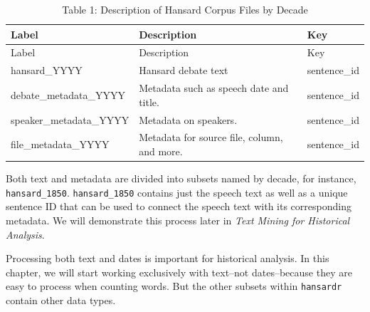 \documentclass[
]{article}
\begin{document}
\begin{longtable}[]{@{}
  >{\raggedright\arraybackslash}p{}
  >{\raggedright\arraybackslash}p{}
  >{\raggedright\arraybackslash}p{}@{}}
\caption{Table 1: Description of Hansard Corpus Files by
Decade}\tabularnewline
\toprule\noalign{}
\begin{minipage}[b]{\linewidth}\raggedright
Label
\end{minipage} & \begin{minipage}[b]{\linewidth}\raggedright
Description
\end{minipage} & \begin{minipage}[b]{\linewidth}\raggedright
Key
\end{minipage} \\
\midrule\noalign{}
\endfirsthead
\toprule\noalign{}
\begin{minipage}[b]{\linewidth}\raggedright
Label
\end{minipage} & \begin{minipage}[b]{\linewidth}\raggedright
Description
\end{minipage} & \begin{minipage}[b]{\linewidth}\raggedright
Key
\end{minipage} \\
\midrule\noalign{}
\endhead
\bottomrule\noalign{}
\endlastfoot
hansard\_YYYY & Hansard debate text & sentence\_id \\
debate\_metadata\_YYYY & Metadata such as speech date and title. &
sentence\_id \\
speaker\_metadata\_YYYY & Metadata on speakers. & sentence\_id \\
file\_metadata\_YYYY & Metadata for source file, column, and more. &
sentence\_id \\
\end{longtable}

Both text and metadata are divided into subsets named by decade, for
instance, \texttt{hansard\_1850}. \texttt{hansard\_1850} contains just
the speech text as well as a unique sentence ID that can be used to
connect the speech text with its corresponding metadata. We will
demonstrate this process later in \emph{Text Mining for Historical
Analysis}.

Processing both text and dates is important for historical analysis. In
this chapter, we will start working exclusively with text--not
dates--because they are easy to process when counting words. But the
other subsets within \texttt{hansardr} contain other data types.
\end{document}
